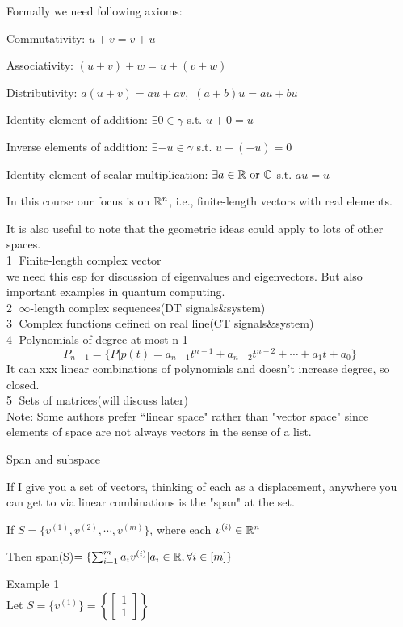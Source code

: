 Formally we need following axioms:

Commutativity: $u+v=v+u$

Associativity: $(u+v)+w=u+(v+w)$

Distributivity: $a(u+v)=au+av$,\ $(a+b)u=au+bu$

Identity element of addition: $\exists 0\in \gamma$ s.t. $u+0=u$

Inverse elements of addition: $\exists -u\in \gamma$ s.t. $u+(-u)=0$

Identity element of scalar multiplication: $\exists a\in \mathbb{R}\ \text{or}\ \mathbb{C}$ s.t. $au=u$

In this course our focus is on $\mathbb{R}^{n}$, i.e., finite-length vectors with real elements.

It is also useful to note that the geometric ideas could apply to lots of other spaces.\\
\textcircled{1} Finite-length complex vector\\
we need this esp for discussion of eigenvalues and eigenvectors. But also important examples in quantum computing.\\
\textcircled{2} $\infty$-length complex sequences(DT signals\&system)\\
\textcircled{3} Complex functions defined on real line(CT signals\&system)\\
\textcircled{4} Polynomials of degree at most n-1\\
$$P_{n-1}=\{P|p(t)=a_{n-1}t^{n-1}+a_{n-2}t^{n-2}+\cdots + a_{1}t+a_{0} \}$$
It can xxx linear combinations of polynomials and doesn't increase degree, so closed.\\
\textcircled{5} Sets of matrices(will discuss later)\\

Note: Some authors prefer “linear space" rather than "vector space" since elements of space are not always vectors in the sense of a list.

\vspace{0.5cm}

Span and subspace

If I give you a set of vectors, thinking of each as a displacement, anywhere you can get to via linear combinations is the "span" at the set.

If $S=\{v^{(1)}, v^{(2)}, \cdots ,v^{(m)}\}$, where each $v^{(i)}\in \mathbb{R}^{n}$

Then span(S)$=\{\sum_{i=1}^{m} a_{i}v^{(i)}| a_{i}\in \mathbb{R} ,\forall i\in [m]\}$

Example 1\\
Let $S=\{v^{(1)}\}=\left\{ 
\left[ 
\begin{array}{c} 
1 \\
1
\end{array}
\right]\right\}$

